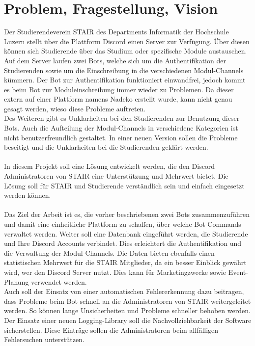 \documentclass[a4paper, table]{article}
\begin{document}
\section{Problem, Fragestellung, Vision}
Der Studierendeverein STAIR des Departments Informatik der Hochschule Luzern stellt über die Plattform Discord einen Server zur Verfügung. 
Über diesen können sich Studierende über das Studium oder spezifische Module austauschen.\\
Auf dem Server laufen zwei Bots, welche sich um die Authentifikation der Studierenden sowie um die Einschreibung in die verschiedenen Modul-Channels kümmern. 
Der Bot zur Authentifikation funktioniert einwandfrei, jedoch kommt es beim Bot zur Moduleinschreibung immer wieder zu Problemen. 
Da dieser extern auf einer Plattform namens Nadeko erstellt wurde, kann nicht genau gesagt werden, wieso diese Probleme auftreten.\\
Des Weiteren gibt es Unklarheiten bei den Studierenden zur Benutzung dieser Bots. 
Auch die Aufteilung der Modul-Channels in verschiedene Kategorien ist nicht benutzerfreundlich gestaltet. 
In einer neuen Version sollen die Probleme beseitigt und die Unklarheiten bei die Studierenden geklärt werden.\\\\
In diesem Projekt soll eine Lösung entwickelt werden, die den Discord Administratoren von STAIR eine Unterstützung und Mehrwert bietet. 
Die Lösung soll für STAIR und Studierende verständlich sein und einfach eingesetzt werden können.\\\\
Das Ziel der Arbeit ist es, die vorher beschriebenen zwei Bots zusammenzuführen und damit eine einheitliche Plattform zu schaffen, über welche Bot Commands verwaltet werden. 
Weiter soll eine Datenbank eingeführt werden, die Studierende und Ihre Discord Accounts verbindet. 
Dies erleichtert die Authentifikation und die Verwaltung der Modul-Channels. 
Die Daten bieten ebenfalls einen statistischen Mehrwert für die STAIR Mitglieder, da ein besser Einblick gewährt wird, wer den Discord Server nutzt. 
Dies kann für Marketingzwecke sowie Event-Planung verwendet werden.\\
Auch soll der Einsatz von einer automatischen Fehlererkennung dazu beitragen, dass Probleme beim Bot schnell an die Administratoren von STAIR weitergeleitet werden. 
So können lange Unsicherheiten und Probleme schneller behoben werden. 
Der Einsatz einer neuen Logging-Library soll die Nachvollziehbarkeit der Software sicherstellen. 
Diese Einträge sollen die Administratoren beim allfälligen Fehlersuchen unterstützen.
\end{document}
